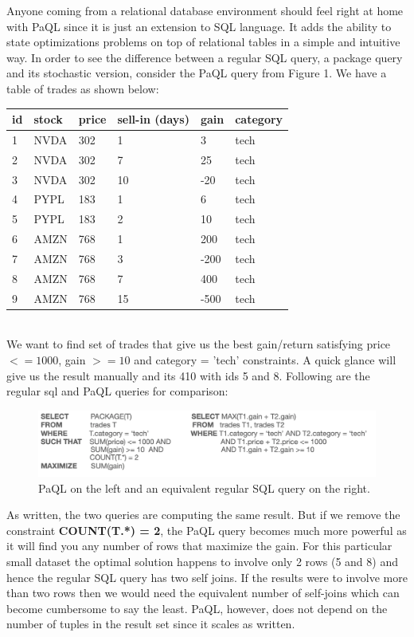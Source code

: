 \documentclass[a4paper,12pt]{article}
\begin{document}
Anyone coming from a relational database environment should feel right at home with PaQL since it is just an extension to SQL language. It adds the ability to state optimizations problems on top of relational tables in a simple and intuitive way. In order to see the difference between a regular SQL query, a package query and its stochastic version, consider the PaQL query from Figure 1. We have a table of trades as shown below:
\\

\begin{tabularx}{.982\textwidth} { |p{2cm}|p{2cm}|p{2cm}|p{2cm}|p{2cm}|p{2cm}| }
 \hline
 \textbf{id} & \textbf{stock} & \textbf{price} & \textbf{sell-in (days)} & \textbf{gain} & \textbf{category} \\
 \hline
1  & NVDA  & 302 & 1 & 3 & tech \\
\hline
2  & NVDA  & 302 & 7 & 25 & tech\\
\hline
3  & NVDA  & 302 & 10 & -20 & tech \\
\hline
4  & PYPL  & 183 & 1 & 6 & tech\\
\hline
5  & PYPL  & 183 & 2 & 10 & tech\\
\hline
6  & AMZN  & 768 & 1 & 200 & tech\\
\hline
7  & AMZN  & 768 & 3 & -200 & tech\\
\hline
8  & AMZN  & 768 & 7 & 400 & tech\\
\hline
9  & AMZN  & 768 & 15 & -500 & tech\\
\hline
\end{tabularx}
\\

We want to find set of trades that give us the best gain/return satisfying price $<= 1000$, gain $>= 10$ and category = 'tech' constraints. A quick glance will give us the result manually and its 410 with ids 5 and 8. Following are the regular sql and PaQL queries for comparison:
\\
\begin{figure}[h]
\includegraphics[scale=.7]{3}
\caption{PaQL on the left and an equivalent regular SQL query on the right.}
\centering
\end{figure}

As written, the two queries are computing the same result. But if we remove the constraint \textbf{COUNT(T.*) = 2}, the PaQL query becomes much more powerful as it will find you any number of rows that maximize the gain. For this particular small dataset the optimal solution happens to involve only 2 rows (5 and 8) and hence the regular SQL query has two self joins. If the results were to involve more than two rows then we would need the equivalent number of self-joins which can become cumbersome to say the least. PaQL, however, does not depend on the number of tuples in the result set since it scales as written.
\\
\end{document}

